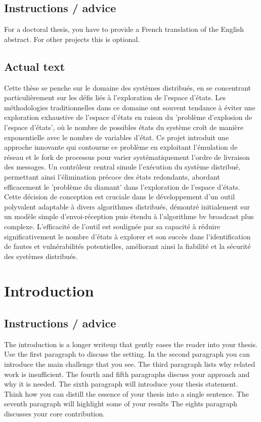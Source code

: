 \documentclass[a4paper,11pt,oneside]{report}
\begin{document}
\begin{frenchabstract}

\section{Instructions / advice}
For a doctoral thesis, you have to provide a French translation of the
English abstract. For other projects this is optional.

\section{Actual text}
Cette thèse se penche sur le domaine des systèmes distribués, en se concentrant particulièrement sur les défis liés à l'exploration de l'espace d'états. Les méthodologies traditionnelles dans ce domaine ont souvent tendance à éviter une exploration exhaustive de l'espace d'états en raison du 'problème d'explosion de l'espace d'états', où le nombre de possibles états du système croît de manière exponentielle avec le nombre de variables d'état. Ce projet introduit une approche innovante qui contourne ce problème en exploitant l'émulation de réseau et le fork de processus pour varier systématiquement l'ordre de livraison des messages. Un contrôleur central simule l'exécution du système distribué, permettant ainsi l'élimination précoce des états redondants, abordant efficacement le 'problème du diamant' dans l'exploration de l'espace d'états. Cette décision de conception est cruciale dans le développement d'un outil polyvalent adaptable à divers algorithmes distribués, démontré initialement sur un modèle simple d'envoi-réception puis étendu à l'algorithme bv broadcast plus complexe. L'efficacité de l'outil est soulignée par sa capacité à réduire significativement le nombre d'états à explorer et son succès dans l'identification de fautes et vulnérabilités potentielles, améliorant ainsi la fiabilité et la sécurité des systèmes distribués.

\end{frenchabstract}

\maketoc

\chapter{Introduction}

\section{Instructions / advice}
The introduction is a longer writeup that gently eases the reader into your
thesis. Use the first paragraph to discuss the setting.
In the second paragraph you can introduce the main challenge that you see.
The third paragraph lists why related work is insufficient.
The fourth and fifth paragraphs discuss your approach and why it is needed.
The sixth paragraph will introduce your thesis statement. Think how you can
distill the essence of your thesis into a single sentence.
The seventh paragraph will highlight some of your results
The eights paragraph discusses your core contribution.
\end{document}
